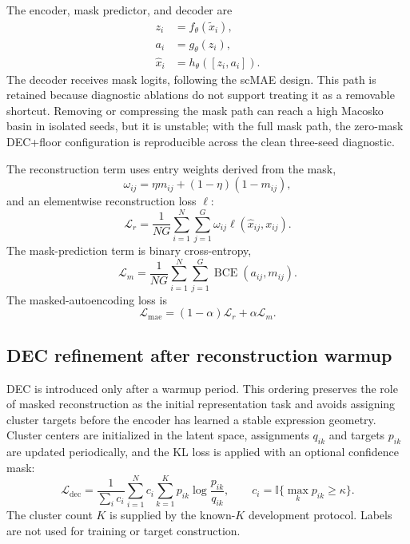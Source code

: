 \documentclass[11pt]{article}
\begin{document}
The encoder, mask predictor, and decoder are
\begin{align}
z_i &= f_{\theta}(\tilde{x}_i), \\
a_i &= g_{\theta}(z_i), \\
\hat{x}_i &= h_{\theta}([z_i,a_i]).
\end{align}
The decoder receives mask logits, following the scMAE design. This path is retained because diagnostic ablations do not support treating it as a removable shortcut. Removing or compressing the mask path can reach a high Macosko basin in isolated seeds, but it is unstable; with the full mask path, the zero-mask DEC+floor configuration is reproducible across the clean three-seed diagnostic.

The reconstruction term uses entry weights derived from the mask,
\begin{equation}
\omega_{ij} = \eta m_{ij} + (1-\eta)(1-m_{ij}),
\end{equation}
and an elementwise reconstruction loss $\ell$:
\begin{equation}
\mathcal{L}_{r}
= \frac{1}{NG}\sum_{i=1}^{N}\sum_{j=1}^{G}
\omega_{ij}\ell(\hat{x}_{ij},x_{ij}).
\end{equation}
The mask-prediction term is binary cross-entropy,
\begin{equation}
\mathcal{L}_{m}
= \frac{1}{NG}\sum_{i=1}^{N}\sum_{j=1}^{G}
\operatorname{BCE}(a_{ij},m_{ij}).
\end{equation}
The masked-autoencoding loss is
\begin{equation}
\mathcal{L}_{\mathrm{mae}}
= (1-\alpha)\mathcal{L}_{r}+\alpha\mathcal{L}_{m}.
\end{equation}

\subsection{DEC refinement after reconstruction warmup}

DEC is introduced only after a warmup period. This ordering preserves the role of masked reconstruction as the initial representation task and avoids assigning cluster targets before the encoder has learned a stable expression geometry. Cluster centers are initialized in the latent space, assignments $q_{ik}$ and targets $p_{ik}$ are updated periodically, and the KL loss is applied with an optional confidence mask:
\begin{equation}
\mathcal{L}_{\mathrm{dec}}
= \frac{1}{\sum_i c_i}
\sum_{i=1}^{N}c_i\sum_{k=1}^{K}
p_{ik}\log\frac{p_{ik}}{q_{ik}},
\qquad
c_i=\mathbb{I}\{\max_k p_{ik}\geq \kappa\}.
\end{equation}
The cluster count $K$ is supplied by the known-$K$ development protocol. Labels are not used for training or target construction.
\end{document}
